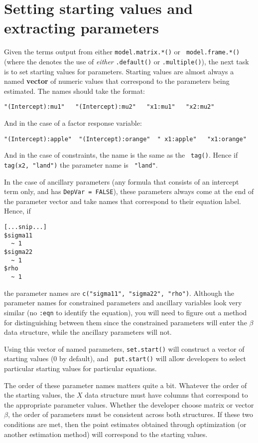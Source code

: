 \documentclass[oneside,letterpaper,12pt]{article}
\begin{document}
\section{Setting starting values and extracting parameters} 

Given the terms output from either {\tt model.matrix.*()} or {\tt
model.frame.*()} (where the {\tt *} denotes the use of \emph{either}
{\tt *.default()} or {\tt *.multiple()}), the next task is to set
starting values for parameters.  Starting values are almost always a
named {\bf vector} of numeric values that correspond to the parameters
being estimated.  The names should take the format:  
\begin{verbatim}
"(Intercept):mu1"   "(Intercept):mu2"   "x1:mu1"   "x2:mu2"
\end{verbatim}
And in the case of a factor response variable:  
\begin{verbatim}
"(Intercept):apple"  "(Intercept):orange"  " x1:apple"   "x1:orange"
\end{verbatim} 
And in the case of constraints, the name is the same as the {\tt
tag()}.  Hence if {\tt tag(x2, "land")} the parameter name is {\tt
"land"}.  

In the case of ancillary parameters (any formula that consists of an
intercept term only, and has {\tt DepVar = FALSE}), these parameters
always come at the end of the parameter vector and take names that
correspond to their equation label.  Hence, if
\begin{verbatim}
[...snip...]
$sigma11
  ~ 1
$sigma22
  ~ 1
$rho
  ~ 1
\end{verbatim} %
the parameter names are {\tt c("sigma11", "sigma22", "rho")}.
Although the parameter names for constrained parameters and ancillary
variables look very similar (no {\tt *:eqn} to identify the equation),
you will need to figure out a method for distinguishing between them
since the constrained parameters will enter the $\beta$ data
structure, while the ancillary parameters will not.  

Using this vector of named parameters, {\tt set.start()} will
construct a vector of starting values (0 by default), and {\tt
put.start()} will allow developers to select particular starting
values for particular equations. 

The order of these parameter names matters quite a bit.  Whatever the
order of the starting values, the $X$ data structure must have columns
that correspond to the appropriate parameter values.  Whether the
developer choose matrix or vector $\beta$, the order of parameters
must be consistent across both structures.  If these two conditions
are met, then the point estimates obtained through optimization (or
another estimation method) will correspond to the starting values. 
\end{document}
